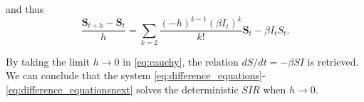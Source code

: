 \documentclass[a4paper]{article}
\renewcommand{\vec}[1]{\boldsymbol{#1}}
\theoremstyle{remark}
\begin{document}
and thus
\begin{equation}
\label{eq:cauchy}
\dfrac{\vec{S}_{t+h}-\vec{S}_{t}}{h}=\sum_{k=2}\dfrac{(-h)^{k-1}(\beta I_t)^{k}}{k!}\vec{S}_{t}-\beta I_t S_t.
\end{equation}

By taking the limit $h\rightarrow{0}$ in \eqref{eq:cauchy}, the relation $dS/dt =  -\beta SI$ is retrieved. We can conclude that the system \eqref{eq:difference_equations}-\eqref{eq:difference_equationsnext} solves the deterministic $SIR$ when $h\rightarrow{0}$. 




\end{document}
